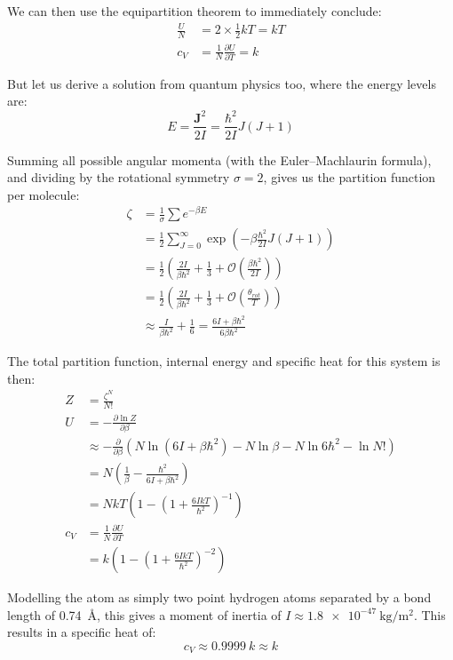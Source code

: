 \documentclass[a4paper]{scrartcl}
\begin{document}
We can then use the equipartition theorem to immediately conclude:
\begin{align*}
    \frac{U}{N} &= 2 \times \frac{1}{2} k T = k T \\
    c_V &= \frac{1}{N} \frac{\partial U}{\partial T} = k
\end{align*}

But let us derive a solution from quantum physics too, where the energy levels are:
\[E = \frac{\mathbf{J}^2}{2 I} = \frac{\hbar^2}{2 I} J (J + 1)\]

Summing all possible angular momenta (with the Euler--Machlaurin formula), and dividing by the rotational symmetry \(\sigma = 2\), gives us the partition function per molecule:
\begin{align*}
    \zeta &= \frac{1}{\sigma} \sum e^{-\beta E} \\
    &= \frac{1}{2} \sum_{J = 0}^\infty \exp\left(-\beta \frac{\hbar^2}{2 I} J (J + 1)\right) \\
    &= \frac{1}{2} \left(\frac{2 I}{\beta \hbar^2} + \frac{1}{3} + \mathcal{O}\left(\frac{\beta \hbar^2}{2 I}\right)\right) \\
    &= \frac{1}{2} \left(\frac{2 I}{\beta \hbar^2} + \frac{1}{3} + \mathcal{O}\left(\frac{\theta_{rot}}{T}\right)\right) \\
    &\approx \frac{I}{\beta \hbar^2} + \frac{1}{6} = \frac{6 I + \beta \hbar^2}{6 \beta \hbar^2}
\end{align*}

The total partition function, internal energy and specific heat for this system is then:
\begin{align*}
    Z &= \frac{\zeta^N}{N!} \\
    U &= -\frac{\partial \ln Z}{\partial \beta} \\
    &\approx -\frac{\partial}{\partial \beta} \left(N \ln\left(6 I + \beta \hbar^2\right) - N \ln \beta - N \ln 6 \hbar^2 - \ln N!\right) \\
    &= N \left(\frac{1}{\beta} - \frac{\hbar^2}{6 I + \beta \hbar^2}\right) \\
    &= N k T \left(1 - \left(1 + \frac{6 I k T}{\hbar^2}\right)^{-1}\right) \\
    c_V &= \frac{1}{N} \frac{\partial U}{\partial T} \\
    &= k \left(1 - \left(1 + \frac{6 I k T}{\hbar^2}\right)^{-2}\right)
\end{align*}

Modelling the  atom as simply two point hydrogen atoms separated by a bond length of \SI{0.74}{\angstrom}, this gives a moment of inertia of \(I \approx \SI{1.8e-47}{\kilo\gram\per\metre\squared}\). This results in a specific heat of:
\[c_V \approx 0.9999\: k \approx k\]
\end{document}
